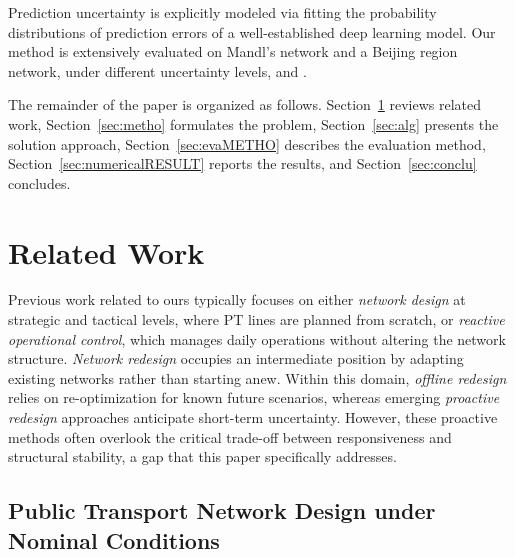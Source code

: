 \documentclass[a4paper,fleqn]{cas-sc}
\begin{document}
Prediction uncertainty is explicitly modeled via fitting the probability distributions of prediction errors of a well-established deep learning model. Our method is extensively evaluated on Mandl's network and a Beijing region network, under different uncertainty levels, and .

The remainder of the paper is organized as follows. 
Section~\ref{sec:relatedWork} reviews related work, Section~\ref{sec:metho} formulates the problem, Section~\ref{sec:alg} presents the solution approach, Section~\ref{sec:evaMETHO} describes the evaluation method, Section~\ref{sec:numericalRESULT} reports the results, and Section~\ref{sec:conclu} concludes.


\section{Related Work}\label{sec:relatedWork}

Previous work related to ours typically focuses on either \textit{network design} at strategic and tactical levels, where PT lines are planned from scratch, or \textit{reactive operational control}, which manages daily operations without altering the network structure.
\textit{Network redesign} occupies an intermediate position by adapting existing networks rather than starting anew.
Within this domain, \textit{offline redesign} relies on re-optimization for known future scenarios, whereas emerging \textit{proactive redesign} approaches anticipate short-term uncertainty.
However, these proactive methods often overlook the critical trade-off between responsiveness and structural stability, a gap that this paper specifically addresses.

\subsection{Public Transport Network Design under Nominal Conditions}
\label{sec:preventive}
\end{document}
